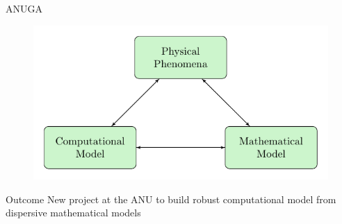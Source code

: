 \documentclass[handout]{beamer}
\begin{document}
\begin{frame}{ANUGA}
	\begin{figure}
		\includegraphics[width=\textwidth]{./Pics/ModelDiagrams/FlowChartHighAllG.pdf}
	\end{figure}
\end{frame}

\begin{frame}{Outcome}
 New project at the ANU to build robust computational model from dispersive mathematical models
\end{frame}
\end{document}
